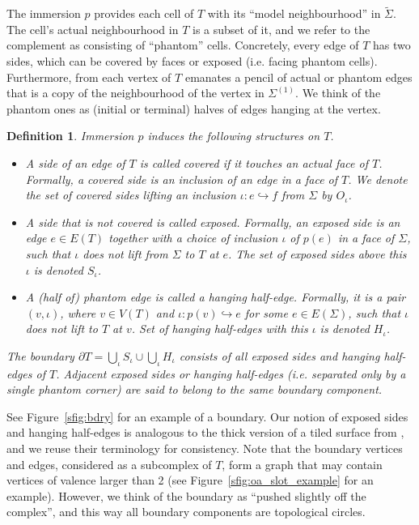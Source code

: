 \documentclass{amsart}
\newtheorem{definition}[conjecture]{Definition}
\begin{document}
The immersion $p$ provides each cell of $T$ with its ``model neighbourhood'' in $\widetilde\Sigma$. The cell's actual neighbourhood in $T$ is a subset of it, and we refer to the complement as consisting of ``phantom'' cells. Concretely, every edge of $T$ has two sides, which can be covered by faces or exposed (i.e. facing phantom cells). Furthermore, from each vertex of $T$ emanates a pencil of actual or phantom edges that is a copy of the neighbourhood of the vertex in $\Sigma^{(1)}$. We think of the phantom ones as (initial or terminal) halves of edges hanging at the vertex.
\begin{definition}\label{def:bdry}
Immersion $p$ induces the following structures on $T$.
\begin{itemize}
\item A side of an edge of $T$ is called \emph{covered} if it touches an actual face of $T$. Formally, a covered side is an inclusion of an edge in a face of $T$. We denote the set of covered sides lifting an inclusion $\iota\colon e\hookrightarrow f$ from $\Sigma$ by $O_\iota$.
\item A side that is not covered is called \emph{exposed}. Formally, an exposed side is an edge $e\in E(T)$ together with a choice of inclusion $\iota$ of $p(e)$ in a face of $\Sigma$, such that $\iota$ does not lift from $\Sigma$ to $T$ at $e$. The set of exposed sides above this $\iota$ is denoted $S_\iota$.
\item A (half of) phantom edge is called a \emph{hanging half-edge}. Formally, it is a pair $(v,\iota)$, where $v\in V(T)$ and $\iota\colon p(v)\hookrightarrow e$ for some $e\in E(\Sigma)$, such that $\iota$ does not lift to $T$ at $v$. Set of hanging half-edges with this $\iota$ is denoted $H_\iota$.
\end{itemize}
The \emph{boundary} $\partial T=\bigcup_\iota S_\iota\cup\bigcup_\iota H_\iota$ consists of all exposed sides and hanging half-edges of $T$. Adjacent exposed sides or hanging half-edges (i.e. separated only by a single phantom corner) are said to belong to the same \emph{boundary component}.
\end{definition}
See Figure~\ref{sfig:bdry} for an example of a boundary. Our notion of exposed sides and hanging half-edges is analogous to the thick version of a tiled surface from \cites[Definitions 2.2, 2.3]{asymptotic_stats_random_covering_surfaces_MageePuder23}[\S 3.2]{core_surfaces_MageePuder22}, and we reuse their terminology for consistency. Note that the boundary vertices and edges, considered as a subcomplex of $T$, form a graph that may contain vertices of valence larger than 2 (see Figure~\ref{sfig:oa_slot_example} for an example). However, we think of the boundary as ``pushed slightly off the complex'', and this way all boundary components are topological circles.
\end{document}
